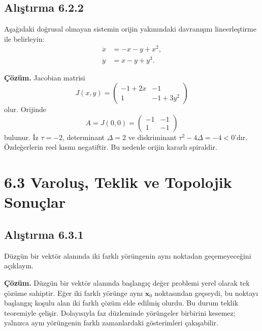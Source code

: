 \subsection*{Alıştırma 6.2.2}

\begin{justify}
Aşağıdaki doğrusal olmayan sistemin orijin yakınındaki davranışını lineerleştirme ile belirleyin:
\begin{align}
\dot{x} &= -x-y+x^2,\\
\dot{y} &= x-y+y^3.
\end{align}

\textbf{Çözüm.} Jacobian matrisi
\begin{equation}
J(x,y)=\begin{pmatrix}-1+2x&-1\\1&-1+3y^2\end{pmatrix}
\end{equation}
olur. Orijinde
\begin{equation}
A=J(0,0)=\begin{pmatrix}-1&-1\\1&-1\end{pmatrix}
\end{equation}
bulunur. İz $\tau=-2$, determinant $\Delta=2$ ve diskriminant $\tau^2-4\Delta=-4<0$'dır. Özdeğerlerin reel kısmı negatiftir. Bu nedenle orijin kararlı spiraldir.
\end{justify}

\section*{6.3 Varoluş, Teklik ve Topolojik Sonuçlar}

\subsection*{Alıştırma 6.3.1}

\begin{justify}
Düzgün bir vektör alanında iki farklı yörüngenin aynı noktadan geçemeyeceğini açıklayın.

\textbf{Çözüm.} Düzgün bir vektör alanında başlangıç değer problemi yerel olarak tek çözüme sahiptir. Eğer iki farklı yörünge aynı $\mathbf{x}_0$ noktasından geçseydi, bu noktayı başlangıç koşulu alan iki farklı çözüm elde edilmiş olurdu. Bu durum teklik teoremiyle çelişir. Dolayısıyla faz düzleminde yörüngeler birbirini kesemez; yalnızca aynı yörüngenin farklı zamanlardaki gösterimleri çakışabilir.
\end{justify}


